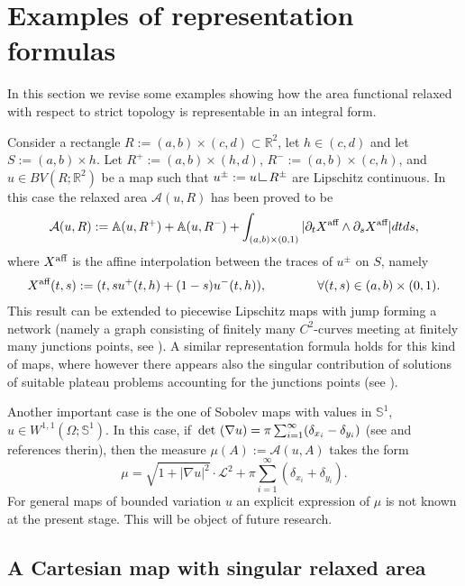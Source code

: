 \documentclass[a4paper,11pt]{article}
\numberwithin{equation}{section}
\newcommand{\Om}{\Omega}
\def\det{\,{\rm det\ }}
\newcommand{\R}{\mathbb{R}}
\newcommand{\res}      {\mathop{\hbox{\vrule height 7pt width .5pt depth
                        0pt\vrule height .5pt width 6pt depth 0pt}}\nolimits}
\begin{document}
\section{Examples of representation formulas}\label{sec_representations}

In this section we revise some examples showing how the  area functional relaxed with respect to strict topology is representable in an integral form.

Consider a rectangle $R:=(a,b)\times (c,d)\subset\R^2$, let $h\in (c,d)$ and let $S:=(a,b)\times h$. Let $R^+:=(a,b)\times (h,d)$, $R^-:=(a,b)\times (c,h)$, and $u\in BV(R;\R^2)$ be a map such that $u^\pm:=u\res R^\pm$ are Lipschitz continuous. In this case the relaxed area $\mathcal A(u,R)$ has been proved to be \cite{BCS2}
\begin{align}
\mathcal A(u,R):=\mathbb A(u,R^+)+\mathbb A(u,R^-)+\int_{(a,b)\times (0,1)}|\partial_t X^{\text{{\rm aff}}}\wedge \partial_s X^{\text{{\rm aff}}}|dtds,
\end{align}  
where $X^{\text{{\rm aff}}}$ is the affine interpolation between the traces of $u^\pm$ on $S$, namely
\begin{align}
X^{\text{{\rm aff}}}(t,s):=(t,s u^+(t,h)+(1-s)u^-(t,h)),\qquad \qquad \forall (t,s)\in (a,b)\times (0,1).
\end{align}
This result can be extended to piecewise Lipschitz maps with jump forming a network (namely a graph consisting of finitely many $C^2$-curves meeting at finitely many junctions points, see \cite{BCS2}). A similar representation formula holds for this kind of maps, where however there appears also the singular contribution of solutions of suitable plateau problems accounting for the junctions points (see \cite[Theorem 1.1]{BCS2}).

Another important case is the one of Sobolev maps with values in $\mathbb S^1$, $u\in W^{1,1}(\Om;\mathbb S^1)$. In this case, if $\det(\nabla u)=\pi \sum_{i=1}^\infty (\delta_{x_i}-\delta_{y_i})$ (see \cite{BSS} and references therin), then the measure $\mu(A):= \mathcal A(u,A)$ takes the form
$$\mu=\sqrt{1+|\nabla u|^2}\cdot\mathcal L^2+\pi\sum_{i=1}^\infty(\delta_{x_i}+\delta_{y_i}).$$ 
For general maps of bounded variation $u$ an explicit expression of $\mu$ is not known at the present stage. This will be object of future research.

\subsection{A Cartesian map with singular relaxed area}
\end{document}

